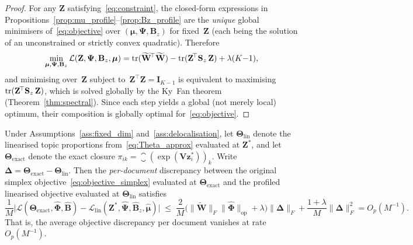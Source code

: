 \begin{proof}
For any $\mathbf{Z}$ satisfying~\eqref{eq:constraint}, the
closed-form expressions in
Propositions~\ref{prop:mu_profile}--\ref{prop:Bz_profile} are the
\emph{unique} global minimisers of~\eqref{eq:objective} over
$(\boldsymbol{\mu},\boldsymbol{\Psi},\mathbf{B}_z)$ for
fixed~$\mathbf{Z}$ (each being the solution of an unconstrained or
strictly convex quadratic). Therefore
\[
  \min_{\boldsymbol{\mu},\boldsymbol{\Psi},\mathbf{B}_z}
  \mathcal{L}(\mathbf{Z},\boldsymbol{\Psi},\mathbf{B}_z,\boldsymbol{\mu})
  = \operatorname{tr}(\widetilde{\mathbf{W}}^{\!\top}\widetilde{\mathbf{W}})
    - \operatorname{tr}(\mathbf{Z}^{\!\top}\mathbf{S}_z\,\mathbf{Z})
    + \lambda(K{-}1),
\]
and minimising over~$\mathbf{Z}$ subject
to~$\mathbf{Z}^{\!\top}\mathbf{Z}=\mathbf{I}_{K-1}$ is equivalent to
maximising $\operatorname{tr}(\mathbf{Z}^{\!\top}\mathbf{S}_z\,\mathbf{Z})$, which
is solved globally by the Ky~Fan theorem
(Theorem~\ref{thm:spectral}). Since each step yields a global
(not merely local) optimum, their composition is globally optimal
for~\eqref{eq:objective}.
\end{proof}

\begin{corollary}
\label{cor:approx_quality}
Under Assumptions~\ref{ass:fixed_dim} and~\ref{ass:delocalisation},
let $\boldsymbol{\Theta}_{\mathrm{lin}}$ denote the linearised
topic proportions from~\eqref{eq:Theta_approx} evaluated at
$\mathbf{Z}^*$, and let
$\boldsymbol{\Theta}_{\mathrm{exact}}$ denote the exact closure
$\pi_{ik}=\closure(\exp(\mathbf{V}\mathbf{z}_i^*))_k$.
Write $\boldsymbol{\Delta}
= \boldsymbol{\Theta}_{\mathrm{exact}}-\boldsymbol{\Theta}_{\mathrm{lin}}$.
Then the \emph{per-document} discrepancy between the original simplex
objective~\eqref{eq:objective_simplex} evaluated at
$\boldsymbol{\Theta}_{\mathrm{exact}}$ and the profiled linearised
objective evaluated at $\boldsymbol{\Theta}_{\mathrm{lin}}$ satisfies
\begin{equation}
  \frac{1}{M}
  \bigl|
    \mathcal{L}(\boldsymbol{\Theta}_{\mathrm{exact}},
      \hat{\boldsymbol{\Phi}},\hat{\mathbf{B}})
    - \mathcal{L}_{\mathrm{lin}}(\mathbf{Z}^*,
      \hat{\boldsymbol{\Psi}},\hat{\mathbf{B}}_z,\hat{\boldsymbol{\mu}})
  \bigr|
  \;\leq\;
  \frac{2}{M}\bigl(\|\widetilde{\mathbf{W}}\|_F
         \|\hat{\boldsymbol{\Phi}}\|_{\mathrm{op}}
         + \lambda\bigr)
  \|\boldsymbol{\Delta}\|_F
  + \frac{1+\lambda}{M}\|\boldsymbol{\Delta}\|_F^2
  = O_p(M^{-1}).
  \label{eq:approx_quality}
\end{equation}
That is, the average objective discrepancy per document vanishes at
rate $O_p(M^{-1})$.
\end{corollary}

